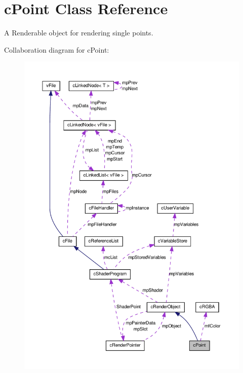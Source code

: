 \hypertarget{classc_point}{
\section{cPoint Class Reference}
\label{classc_point}
}


A Renderable object for rendering single points.  




Collaboration diagram for cPoint:\nopagebreak
\begin{figure}[H]
\begin{center}
\leavevmode
\includegraphics[width=400pt]{classc_point__coll__graph}
\end{center}
\end{figure}
